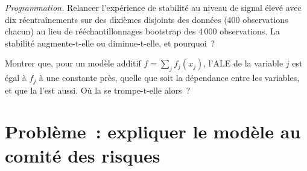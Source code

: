 \begin{exercise}[$\star\star\star$]\label{exo:ml:interpretability-and-model-governance:7}
\emph{Programmation.} Relancer l'expérience de stabilité au niveau de signal élevé avec dix réentraînements sur des dixièmes disjoints des données
(400 observations chacun) au lieu de rééchantillonnages bootstrap des 4\,000 observations. La stabilité augmente-t-elle ou diminue-t-elle, et pourquoi~?
\end{exercise}

\begin{exercise}[$\star\star\star$]\label{exo:ml:interpretability-and-model-governance:8}
Montrer que, pour un modèle additif $f = \sum_jf_j(x_j)$, l'ALE de la variable $j$ est égal à $f_j$ à une constante près, quelle que soit
la dépendance entre les variables, et que la  l'est aussi. Où la  se trompe-t-elle alors~?
\end{exercise}

\section{Problème~: expliquer le modèle au comité des risques}

